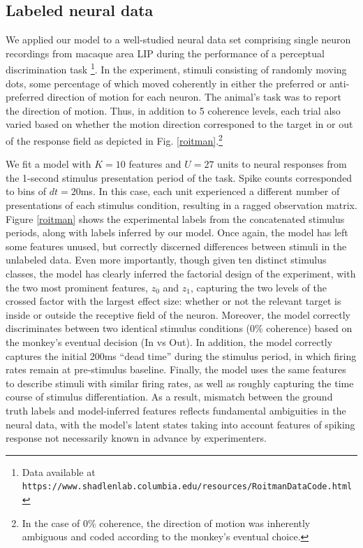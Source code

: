 \documentclass[10pt,letterpaper]{article}
\begin{document}
\subsection*{Labeled neural data}
We applied our model to a well-studied neural data set comprising single neuron recordings from macaque area LIP during the performance of a perceptual discrimination task \cite{roitman2002response}\footnote{Data available at \texttt{https://www.shadlenlab.columbia.edu/resources/RoitmanDataCode.html}}. In the experiment, stimuli consisting of randomly moving dots, some percentage of which moved coherently in either the preferred or anti-preferred direction of motion for each neuron. The animal's task was to report the direction of motion. Thus, in addition to 5 coherence levels, each trial also varied based on whether the motion direction corresponed to the target in or out of the response field as depicted in Fig. \ref{roitman}.\footnote{In the case of 0\% coherence, the direction of motion was inherently ambiguous and coded according to the monkey's eventual choice.}

We fit a model with $K = 10$ features and $U = 27$ units to neural responses from the 1-second stimulus presentation period of the task. Spike counts corresponded to bins of $dt = 20$ms. In this case, each unit experienced a different number of presentations of each stimulus condition, resulting in a ragged observation matrix. Figure \ref{roitman} shows the experimental labels from the concatenated stimulus periods, along with labels inferred by our model. Once again, the model has left some features unused, but correctly discerned differences between stimuli in the unlabeled data. Even more importantly, though given ten distinct stimulus classes, the model has clearly inferred the factorial design of the experiment, with the two most prominent features, $z_0$ and $z_1$, capturing the two levels of the crossed factor with the largest effect size: whether or not the relevant target is inside or outside the receptive field of the neuron. Moreover, the model correctly discriminates between two identical stimulus conditions (0\% coherence) based on the monkey's eventual decision (In vs Out). In addition, the model correctly captures the initial 200ms ``dead time'' during the stimulus period, in which firing rates remain at pre-stimulus baseline. Finally, the model uses the same features to describe stimuli with similar firing rates, as well as roughly capturing the time course of stimulus differentiation. As a result, mismatch between the ground truth labels and model-inferred features reflects fundamental ambiguities in the neural data, with the model's latent states taking into account features of spiking response not necessarily known in advance by experimenters.
\end{document}
